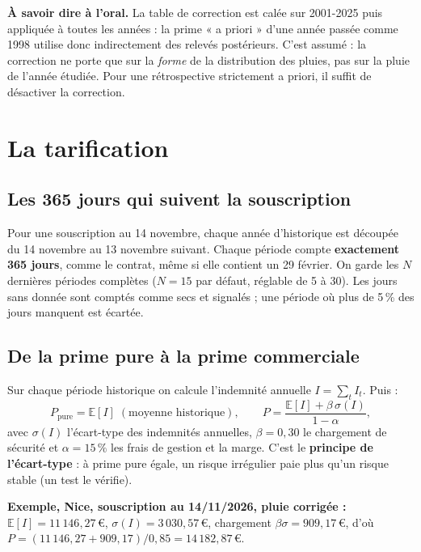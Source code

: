 \documentclass[11pt,a4paper]{article}
\newcommand{\eur}[1]{#1\,€}
\begin{document}
\begin{attention}
\textbf{À savoir dire à l'oral.} La table de correction est calée sur 2001-2025 puis appliquée à toutes les années :
la prime « a priori » d'une année passée comme 1998 utilise donc indirectement des relevés postérieurs. C'est assumé :
la correction ne porte que sur la \emph{forme} de la distribution des pluies, pas sur la pluie de l'année étudiée.
Pour une rétrospective strictement a priori, il suffit de désactiver la correction.
\end{attention}

\section{La tarification}

\subsection{Les 365 jours qui suivent la souscription}
Pour une souscription au 14 novembre, chaque année d'historique est découpée du 14 novembre au 13 novembre suivant.
Chaque période compte \textbf{exactement 365 jours}, comme le contrat, même si elle contient un 29 février.
On garde les $N$ dernières périodes complètes ($N = 15$ par défaut, réglable de 5 à 30). Les jours sans donnée sont
comptés comme secs et signalés ; une période où plus de 5\,\% des jours manquent est écartée.

\subsection{De la prime pure à la prime commerciale}
Sur chaque période historique on calcule l'indemnité annuelle $I = \sum_t I_t$. Puis :
\[
P_{\text{pure}} = \mathbb{E}[I] \;(\text{moyenne historique}),\qquad
P = \frac{\mathbb{E}[I] + \beta\,\sigma(I)}{1 - \alpha},
\]
avec $\sigma(I)$ l'écart-type des indemnités annuelles, $\beta = 0{,}30$ le chargement de sécurité et $\alpha = 15\,\%$
les frais de gestion et la marge. C'est le \textbf{principe de l'écart-type} : à prime pure égale, un risque irrégulier
paie plus qu'un risque stable (un test le vérifie).

\begin{encadre}
\textbf{Exemple, Nice, souscription au 14/11/2026, pluie corrigée :} $\mathbb{E}[I] = \eur{11\,146{,}27}$,
$\sigma(I) = \eur{3\,030{,}57}$, chargement $\beta\sigma = \eur{909{,}17}$, d'où
$P = (11\,146{,}27 + 909{,}17)/0{,}85 = \eur{14\,182{,}87}$.
\end{encadre}
\end{document}
